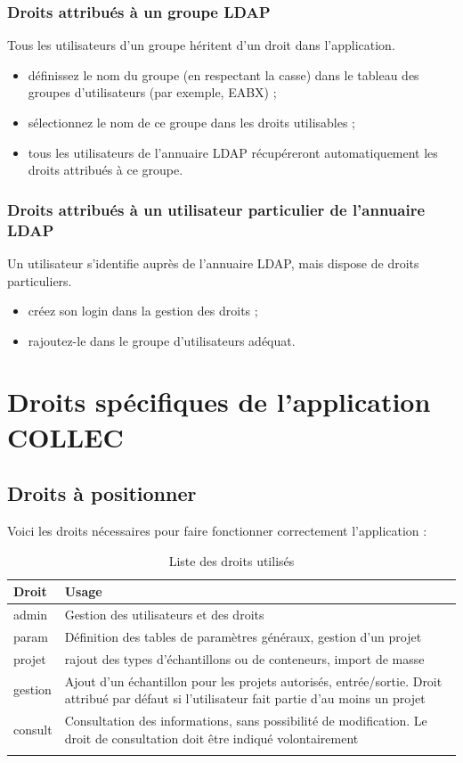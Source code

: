 \subsubsection{Droits attribués à un groupe LDAP}

Tous les utilisateurs d'un groupe héritent d'un droit dans l'application.

\begin{itemize}
\item définissez le nom du groupe (en respectant la casse) dans le tableau des groupes d'utilisateurs (par exemple, EABX) ;
\item sélectionnez le nom de ce groupe dans les droits utilisables ;
\item tous les utilisateurs de l'annuaire LDAP récupéreront automatiquement les droits attribués à ce groupe.
\end{itemize}

\subsubsection{Droits attribués à un utilisateur particulier de l'annuaire LDAP}

Un utilisateur s'identifie auprès de l'annuaire LDAP, mais dispose de droits particuliers.

\begin{itemize}
\item créez son login dans la gestion des droits ;
\item rajoutez-le dans le groupe d'utilisateurs adéquat.
\end{itemize}


\section{Droits spécifiques de l'application COLLEC}

\subsection{Droits à positionner}
Voici les droits nécessaires pour faire fonctionner correctement l'application :

\begin{longtable}{|p{5cm}|p{10cm}|}
\hline
\textbf{Droit} & \textbf{Usage} \\
\hline
\endhead
admin &	Gestion des utilisateurs et des droits\\
\hline
param &	Définition des tables de paramètres généraux, gestion d'un projet\\
\hline
projet &	rajout des types d'échantillons ou de conteneurs, import de masse \\
\hline
gestion &	Ajout d'un échantillon pour les projets autorisés, entrée/sortie. Droit attribué par défaut si l'utilisateur fait partie d'au moins un projet \\
\hline
consult	& Consultation des informations, sans possibilité de modification. Le droit de consultation doit être indiqué volontairement\\
\hline

\caption{\label{droitsCollec}Liste des droits utilisés}
\end{longtable}

